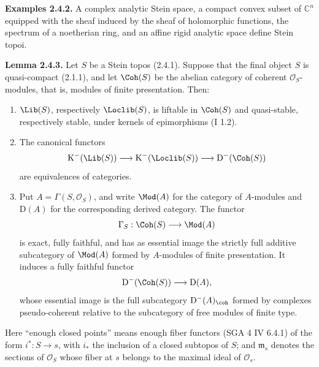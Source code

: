 \textbf{Examples 2.4.2.} A complex analytic Stein space, a compact convex subset of $\mathbb C^n$ equipped with the sheaf induced by the sheaf of holomorphic functions, the spectrum of a noetherian ring, and an affine rigid analytic space define Stein topoi.

\textbf{Lemma 2.4.3.} Let $S$ be a Stein topos (2.4.1). Suppose that the final object $S$ is quasi-compact (2.1.1), and let $\Coh(S)$ be the abelian category of coherent $\mathcal O_S$-modules, that is, modules of finite presentation. Then:
\begin{enumerate}[label=\alph*)]
\item $\Lib(S)$, respectively $\Loclib(S)$, is liftable in $\Coh(S)$ and quasi-stable, respectively stable, under kernels of epimorphisms (I 1.2).
\item The canonical functors
\[
\mathrm K^{-}(\Lib(S))\longrightarrow \mathrm K^{-}(\Loclib(S))\longrightarrow \mathrm D^{-}(\Coh(S))
\]
are equivalences of categories.
\item Put $A=\Gamma(S,\mathcal O_S)$, and write $\Mod(A)$ for the category of $A$-modules and $\mathrm D(A)$ for the corresponding derived category. The functor
\[
\Gamma_S:\Coh(S)\longrightarrow\Mod(A)
\]
is exact, fully faithful, and has as essential image the strictly full additive subcategory of $\Mod(A)$ formed by $A$-modules of finite presentation. It induces a fully faithful functor
\[
\mathrm D^{-}(\Coh(S))\longrightarrow\mathrm D(A),
\]
whose essential image is the full subcategory $\mathrm D^{-}(A)_{\coh}$ formed by complexes pseudo-coherent relative to the subcategory of free modules of finite type.
\end{enumerate}
Here ``enough closed points'' means enough fiber functors (SGA 4 IV 6.4.1) of the form $i^*:S\to s$, with $i_*$ the inclusion of a closed subtopos of $S$; and $\mathfrak m_s$ denotes the sections of $\mathcal O_S$ whose fiber at $s$ belongs to the maximal ideal of $\mathcal O_s$.

